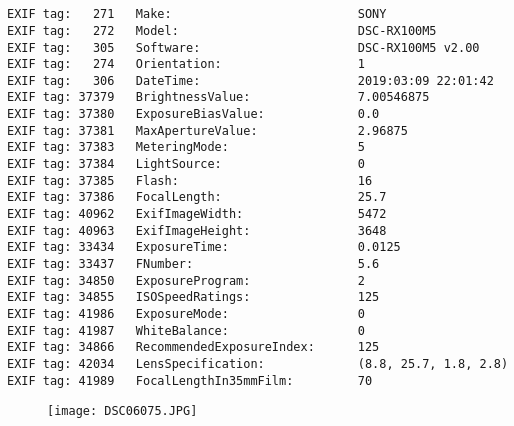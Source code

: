 \section{\protect{}}
\noindent 
\noindent
\begin{lstlisting}
EXIF tag:   271   Make:                          SONY
EXIF tag:   272   Model:                         DSC-RX100M5
EXIF tag:   305   Software:                      DSC-RX100M5 v2.00
EXIF tag:   274   Orientation:                   1
EXIF tag:   306   DateTime:                      2019:03:09 22:01:42
EXIF tag: 37379   BrightnessValue:               7.00546875
EXIF tag: 37380   ExposureBiasValue:             0.0
EXIF tag: 37381   MaxApertureValue:              2.96875
EXIF tag: 37383   MeteringMode:                  5
EXIF tag: 37384   LightSource:                   0
EXIF tag: 37385   Flash:                         16
EXIF tag: 37386   FocalLength:                   25.7
EXIF tag: 40962   ExifImageWidth:                5472
EXIF tag: 40963   ExifImageHeight:               3648
EXIF tag: 33434   ExposureTime:                  0.0125
EXIF tag: 33437   FNumber:                       5.6
EXIF tag: 34850   ExposureProgram:               2
EXIF tag: 34855   ISOSpeedRatings:               125
EXIF tag: 41986   ExposureMode:                  0
EXIF tag: 41987   WhiteBalance:                  0
EXIF tag: 34866   RecommendedExposureIndex:      125
EXIF tag: 42034   LensSpecification:             (8.8, 25.7, 1.8, 2.8)
EXIF tag: 41989   FocalLengthIn35mmFilm:         70

\end{lstlisting}
\clearpage
\begin{figure}
\raggedleft
\texttt{[image: DSC06075.JPG]}
\end{figure}


\clearpage
